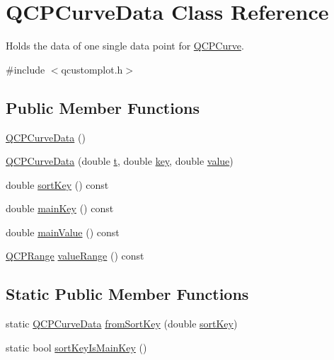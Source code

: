 \hypertarget{class_q_c_p_curve_data}{}\section{Q\+C\+P\+Curve\+Data Class Reference}
\label{class_q_c_p_curve_data}


Holds the data of one single data point for \mbox{\hyperlink{class_q_c_p_curve}{Q\+C\+P\+Curve}}.  




{\ttfamily \#include $<$qcustomplot.\+h$>$}

\subsection*{Public Member Functions}
\begin{DoxyCompactItemize}
\item 
\mbox{\hyperlink{class_q_c_p_curve_data_a48252779b5198a509d99c69ae223fbf8}{Q\+C\+P\+Curve\+Data}} ()
\item 
\mbox{\hyperlink{class_q_c_p_curve_data_a3586be0cc6f8db15bcdd0c0d03b0c173}{Q\+C\+P\+Curve\+Data}} (double \mbox{\hyperlink{class_q_c_p_curve_data_aecc395525be28e9178a088793beb3ff3}{t}}, double \mbox{\hyperlink{class_q_c_p_curve_data_a8a4ec5f2b9a396149fd842e309701bd4}{key}}, double \mbox{\hyperlink{diffusion_8cpp_a4b41795815d9f3d03abfc739e666d5da}{value}})
\item 
double \mbox{\hyperlink{class_q_c_p_curve_data_a583174f2b68e01b4d545f04571f58bd0}{sort\+Key}} () const
\item 
double \mbox{\hyperlink{class_q_c_p_curve_data_ac805ffc8b4207652efb9fcc6a2cdd3e8}{main\+Key}} () const
\item 
double \mbox{\hyperlink{class_q_c_p_curve_data_a39a94131e5f62f16b256bcf8c47a3205}{main\+Value}} () const
\item 
\mbox{\hyperlink{class_q_c_p_range}{Q\+C\+P\+Range}} \mbox{\hyperlink{class_q_c_p_curve_data_acf15deffd18d400651f8384a95dad9f8}{value\+Range}} () const
\end{DoxyCompactItemize}
\subsection*{Static Public Member Functions}
\begin{DoxyCompactItemize}
\item 
static \mbox{\hyperlink{class_q_c_p_curve_data}{Q\+C\+P\+Curve\+Data}} \mbox{\hyperlink{class_q_c_p_curve_data_a40adf1a6ba93051c415a65298b49aa6e}{from\+Sort\+Key}} (double \mbox{\hyperlink{class_q_c_p_curve_data_a583174f2b68e01b4d545f04571f58bd0}{sort\+Key}})
\item 
static bool \mbox{\hyperlink{class_q_c_p_curve_data_a1b78f228e31ca40a1e69add44537918c}{sort\+Key\+Is\+Main\+Key}} ()
\end{DoxyCompactItemize}
